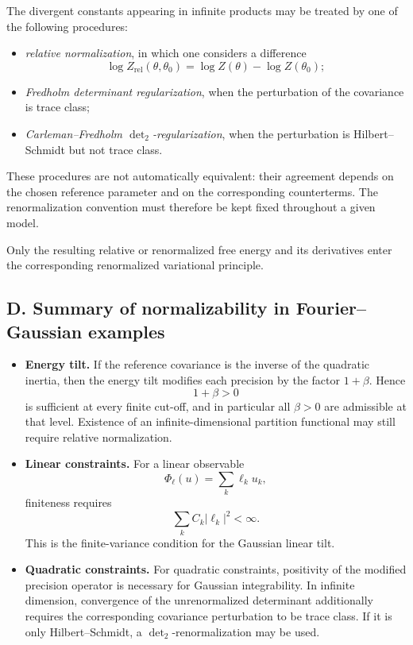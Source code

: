 \documentclass[11pt,reqno]{amsart}
\begin{document}
The divergent constants appearing in infinite products may be treated
by one of the following procedures:
\begin{itemize}
\item \emph{relative normalization}, in which one considers a difference
\[
\log Z_{\mathrm{rel}}(\theta,\theta_0)
=
\log Z(\theta)-\log Z(\theta_0);
\]
\item \emph{Fredholm determinant regularization}, when the perturbation
of the covariance is trace class;
\item \emph{Carleman--Fredholm $\det_2$-regularization}, when the
perturbation is Hilbert--Schmidt but not trace class.
\end{itemize}
These procedures are not automatically equivalent: their agreement
depends on the chosen reference parameter and on the corresponding
counterterms. The renormalization convention must therefore be kept
fixed throughout a given model.

Only the resulting relative or renormalized free energy and its
derivatives enter the corresponding renormalized variational principle.

\subsection*{D. Summary of normalizability in Fourier--Gaussian examples}

\begin{itemize}
\item \textbf{Energy tilt.}
If the reference covariance is the inverse of the quadratic inertia,
then the energy tilt modifies each precision by the factor $1+\beta$.
Hence
\[
1+\beta>0
\]
is sufficient at every finite cut-off, and in particular all
$\beta>0$ are admissible at that level. Existence of an
infinite-dimensional partition functional may still require relative
normalization.

\item \textbf{Linear constraints.}
For a linear observable
\[
\Phi_\ell(u)=\sum_k\ell_k u_k,
\]
finiteness requires
\[
\sum_k C_k|\ell_k|^2<\infty.
\]
This is the finite-variance condition for the Gaussian linear tilt.

\item \textbf{Quadratic constraints.}
For quadratic constraints, positivity of the modified precision
operator is necessary for Gaussian integrability. In infinite
dimension, convergence of the unrenormalized determinant additionally
requires the corresponding covariance perturbation to be trace class.
If it is only Hilbert--Schmidt, a $\det_2$-renormalization may be used.
\end{itemize}
\end{document}
